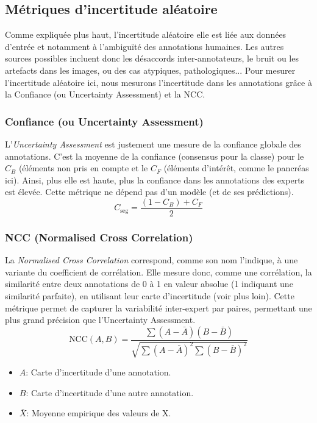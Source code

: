 \documentclass[a4paper,french,bookmarks,12pt]{article}
\begin{document}
    \subsection{Métriques d'incertitude aléatoire}

    Comme expliquée plus haut, l'incertitude aléatoire elle est liée aux données d’entrée et notamment à l'ambiguïté des annotations humaines. Les autres sources possibles incluent donc les désaccords inter-annotateurs, le bruit ou les artefacts dans les images, ou des cas atypiques, pathologiques... Pour mesurer l'incertitude aléatoire ici, nous mesurons l'incertitude dans les annotations grâce à la Confiance  (ou Uncertainty Assessment) et la NCC.

    \subsubsection*{Confiance (ou Uncertainty Assessment)}

    L'\emph{Uncertainty Assessment} est justement une mesure de la confiance globale des annotations. C'est la moyenne de la confiance (consensus pour la classe) pour le  $C_B$ (éléments non pris en compte et le  $C_F$ (éléments d'intérêt, comme le pancréas ici). Ainsi, plus elle est haute, plus la confiance dans les annotations des experts est élevée. Cette métrique ne dépend pas d'un modèle (et de ses prédictions).
    \[ C_{\text{seg}} = \frac{(1 - C_B) + C_F}{2} \]

    
    \subsubsection*{NCC (Normalised Cross Correlation)}

    La \emph{Normalised Cross Correlation} correspond, comme son nom l'indique, à une variante du coefficient de corrélation. Elle mesure donc, comme une corrélation, la similarité entre deux annotations de 0 à 1 en valeur absolue (1 indiquant une similarité parfaite), en utilisant leur carte d'incertitude (voir plus loin). Cette métrique permet de capturer la variabilité inter-expert par paires, permettant une plus grand précision que l'Uncertainty Assessment.
    \[ \text{NCC}(A, B) = \frac{\sum (A - \bar{A})(B - \bar{B})}{\sqrt{\sum (A - \bar{A})^2 \sum (B - \bar{B})^2}} \]
    \begin{itemize}
        \item \( A \): Carte d'incertitude d'une annotation.
        \item \( B \): Carte d'incertitude d'une autre annotation.
        \item \( \bar{X} \): Moyenne empirique des valeurs de X.
    \end{itemize}
\end{document}
